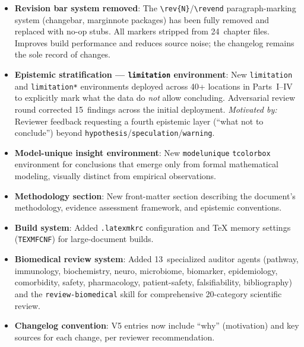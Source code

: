 \begin{itemize}

  \item \textbf{Revision bar system removed}: The \texttt{\textbackslash rev\{N\}}/\texttt{\textbackslash revend}
    paragraph-marking system (changebar, marginnote packages) has been fully removed and
    replaced with no-op stubs. All markers stripped from 24~chapter files. Improves
    build performance and reduces source noise; the changelog remains the sole
    record of changes.

  \item \textbf{Epistemic stratification --- \texttt{limitation} environment}: New
    \texttt{limitation} and \texttt{limitation*} environments deployed across
    40+ locations in Parts~I--IV to explicitly mark what the data do \emph{not}
    allow concluding. Adversarial review round corrected 15~findings across the
    initial deployment.
    \textit{Motivated by:} Reviewer feedback requesting a fourth epistemic layer
    (``what not to conclude'') beyond \texttt{hypothesis}/\texttt{speculation}/\texttt{warning}.

  \item \textbf{Model-unique insight environment}: New \texttt{modelunique}
    \texttt{tcolorbox} environment for conclusions that emerge only from formal
    mathematical modeling, visually distinct from empirical observations.

  \item \textbf{Methodology section}: New front-matter section describing
    the document's methodology, evidence assessment framework, and epistemic
    conventions.

  \item \textbf{Build system}: Added \texttt{.latexmkrc} configuration and
    TeX memory settings (\texttt{TEXMFCNF}) for large-document builds.

  \item \textbf{Biomedical review system}: Added 13~specialized auditor agents
    (pathway, immunology, biochemistry, neuro, microbiome, biomarker,
    epidemiology, comorbidity, safety, pharmacology, patient-safety,
    falsifiability, bibliography) and the \texttt{review-biomedical} skill for
    comprehensive 20-category scientific review.

  \item \textbf{Changelog convention}: V5 entries now include ``why'' (motivation)
    and key sources for each change, per reviewer recommendation.

\end{itemize}

